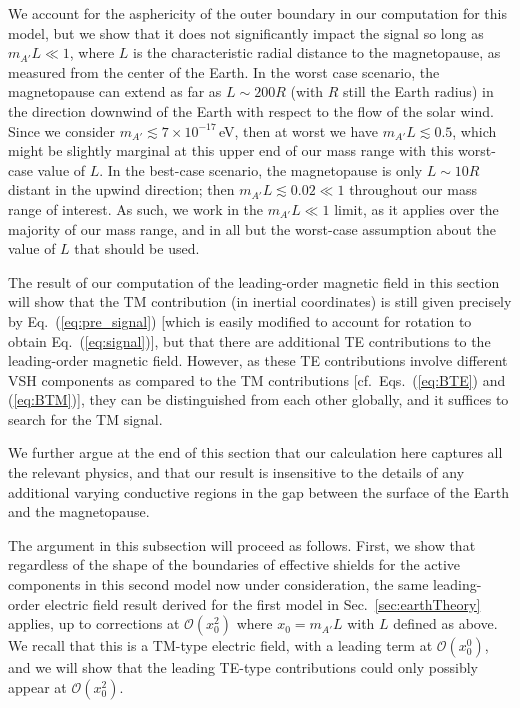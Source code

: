 \documentclass[amsmath,amssymb,aps,10pt,prd,letterpaper,nofootinbib,balancelastpage,notitlepage,superscriptaddress,twocolumn,floatfix]{revtex4-2}
\newcommand{\secref}[2][]{Sec{#1}.~\ref{#2}}		%
\renewcommand{\eqref}[2][]{Eq{#1}.~(\ref{eq:#2})}	%
\begin{document}
We account for the asphericity of the outer boundary in our computation for this model, but we show that it does not significantly impact the signal so long as $m_{A'}L \ll 1$, where $L$ is the characteristic radial distance to the magnetopause, as measured from the center of the Earth.
In the worst case scenario, the magnetopause can extend as far as $L\sim200R$ (with $R$ still the Earth radius) in the direction downwind of the Earth with respect to the flow of the solar wind.
Since we consider $m_{A'} \lesssim 7\times 10^{-17}\,$eV, then at worst we have $m_{A'} L\lesssim 0.5$, which might be slightly marginal at this upper end of our mass range with this worst-case value of $L$.
In the best-case scenario, the magnetopause is only $L\sim 10R$ distant in the upwind direction; then $m_{A'}L \lesssim 0.02 \ll 1$ throughout our mass range of interest.
As such, we work in the $m_{A'}L \ll 1$ limit, as it applies over the majority of our mass range, and in all but the worst-case assumption about the value of $L$ that should be used. 

The result of our computation of the leading-order magnetic field in this section will show that the TM contribution (in inertial coordinates) is still given precisely by \eqref{pre_signal} [which is easily modified to account for rotation to obtain \eqref{signal}], but that there are additional TE contributions to the leading-order magnetic field.
However, as these TE contributions involve different VSH components as compared to the TM contributions [cf.~\eqref[s]{BTE} and (\ref{eq:BTM})], they can be distinguished from each other globally, and it suffices to search for the TM signal.

We further argue at the end of this section that our calculation here captures all the relevant physics, and that our result is insensitive to the details of any additional varying conductive regions in the gap between the surface of the Earth and the magnetopause.

The argument in this subsection will proceed as follows.
First, we show that regardless of the shape of the boundaries of effective shields for the active components in this second model now under consideration, the same leading-order electric field result derived for the first model in \secref{sec:earthTheory} applies, up to corrections at $\mathcal{O}(x_0^2)$ where $x_0=m_{A'}L$ with $L$ defined as above.
We recall that this is a TM-type electric field, with a leading term at $\mathcal{O}(x_0^0)$, and we will show that the leading TE-type contributions could only possibly appear at $\mathcal{O}(x_0^2)$.
\end{document}
